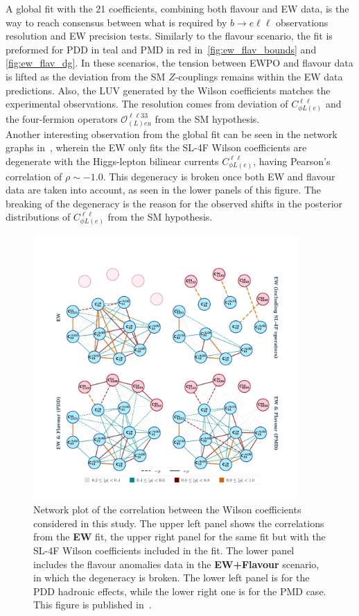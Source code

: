 A global fit with the 21 coefficients, combining both flavour and EW data, is the way to reach consensus between what is required by $ b \to e \ell \ell$ observations resolution and EW precision tests. Similarly to the flavour scenario, the fit is preformed for PDD in \textcolor[HTML]{0f7678}{teal} and PMD in \textcolor[HTML]{760003}{red} in~\autoref{fig:ew_flav_bounds} and \autoref{fig:ew_flav_dg}. In these scenarios, the tension between EWPO and flavour data is lifted as the deviation from the SM $Z$-couplings remains within the EW data predictions. Also, the LUV generated by the Wilson coefficients matches the experimental observations. The resolution comes from deviation of $C_{\phi L (e)}^{\ell \ell}$ and the four-fermion operators $\mathcal{O}_{(L)eu}^{\ell \ell 3 3}$ from the SM hypothesis. \\ Another interesting observation from the global fit can be seen in the network graphs in~\cite{fig:ew_flav_corr}, wherein the EW only fits the SL-4F Wilson coefficients are degenerate with the Higgs-lepton bilinear currents $C_{\phi L (e)}^{\ell \ell}$, having Pearson's correlation of  $\rho \sim -1.0$. This degeneracy is broken once both EW and flavour data are taken into account, as seen in the lower panels of this figure. The breaking of the degeneracy is the reason for the observed shifts in the posterior distributions of $C_{\phi L (e)}^{\ell \ell}$ from the SM hypothesis. \\
\begin{figure}[h!]
	\centering
	\includegraphics[width=0.9\textwidth]{figures/fixed_EW_flavour.pdf}
	\caption{ Network plot of the correlation between the Wilson coefficients considered in this study. The upper left panel shows the correlations from the \textbf{EW} fit, the upper right panel for the same fit but with the SL-4F Wilson coefficients included in the fit. The lower panel includes the flavour anomalies data in the \textbf{EW+Flavour}  scenario, in which the degeneracy is broken. The lower left panel is for the PDD hadronic effects, while the lower right one is for the PMD case. This figure is published in~\cite{Alasfar:2020mne}. 
	}
	\label{fig:ew_flav_corr}
\end{figure}
